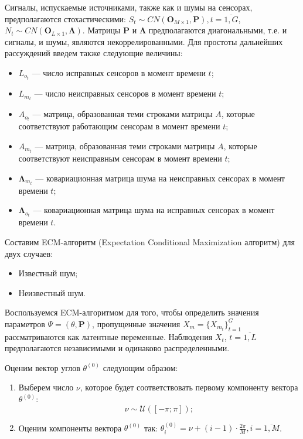 \documentclass[11pt]{article}
\begin{document}
Сигналы, испускаемые источниками, также как и шумы на сенсорах, предполагаются стохастическими: $S_t \sim CN(\mathbf{O}_{M \times 1},\mathbf{P}),t=\overline{1,G}$, $N_t \sim CN(\mathbf{O}_{L \times 1}, \mathbf{\Lambda})$. Матрицы $\mathbf{P}$ и $\mathbf{\Lambda}$ предполагаются диагональными, т.е. и сигналы, и шумы, являются некоррелированными. Для простоты дальнейших рассуждений введем также следующие величины:
\begin{itemize}
\item
$L_{o_t}$ --- число исправных сенсоров в момент времени $t$;
\item
 $L_{m_t}$ --- число неисправных сенсоров в момент времени $t$;
\item 
$A_{o_t}$ --- матрица, образованная теми строками матрицы $A$, которые соответствуют работающим сенсорам в момент времени $t$; 
\item
$A_{m_t}$ --- матрица, образованная теми строками матрицы $A$, которые соответствуют неисправным сенсорам в момент времени $t$;
\item
$\mathbf{\Lambda}_{m_t}$ --- ковариационная матрица шума на неисправных сенсорах в момент времени $t$;
\item 
 $\mathbf{\Lambda}_{o_t}$ --- ковариационная матрица шума на исправных сенсорах в момент времени $t$.
\end{itemize}
Составим ECM-алгоритм (Expectation Conditional Maximization алгоритм) для двух случаев:
\begin{itemize}
\item
Известный шум;
\item
Неизвестный шум.
\end{itemize}
\clearpage
\begin{center}
\fontsize{16}{20}\selectfont {}
\end{center}
Воспользуемся ECM-алгоритмом для того, чтобы определить значения параметров $\Psi = (\theta, \mathbf{P})$, пропущенные значения $X_m=\{X_{m_t}\}_{t=1}^G$ рассматриваются как латентные переменные. Наблюдения $X_t$, $t=\overline{1,L}$ предполагаются независимыми и одинаково распределенными.
\begin{center}
\fontsize{14}{18}\selectfont {}
\end{center}
Оценим вектор углов $\theta^{(0)}$ следующим образом:
\begin{enumerate}
\item
Выберем число $\nu$, которое будет соответствовать первому компоненту вектора $\theta^{(0)}$:
\begin{equation}
\nu \sim \mathcal{U}([-\pi;\pi]);
\end{equation}
\item
Оценим компоненты вектора $\theta^{(0)}$ так:  $\theta^{(0)}_i = \nu + (i-1)\cdot \frac{2\pi}{M}, i = \overline{1,M}$.
\end{enumerate}
\end{document}
